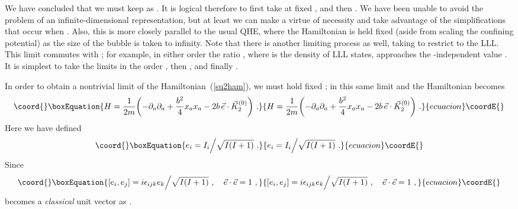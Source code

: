 \documentclass[a4paper,12pt]{article}
\begin{document}
We have concluded that we must keep \coordHE{} as \coordHE{}.  
It is logical therefore to first take \coordHE{} at fixed \coordHE{}, and then \coordHE{}.  We have been unable to avoid the problem of an infinite-dimensional
\coordHE{} representation, but at least we can make a virtue of necessity and take
advantage of the simplifications that occur when \coordHE{}.  Also, this
is more closely parallel to the usual QHE, where the Hamiltonian is held fixed
(aside from scaling the confining potential) as the size of the bubble is
taken to infinity.  Note that there is another limiting process as well,
taking \coordHE{} to restrict to the LLL.  This limit commutes with \coordHE{}; for example, in either order the ratio \coordHE{}, where \myHighlight{$\rho$}\coordHE{} is the
density of LLL states, approaches the
\coordHE{}-independent value \coordHE{}.  It is simplest
to take the limits in the order
\coordHE{}, then \coordHE{}, and finally \coordHE{}.

In order to obtain a nontrivial \coordHE{} limit of the
Hamiltonian~(\ref{su2ham}), we must hold fixed \coordHE{}; in this same limit
\coordHE{} and the Hamiltonian becomes
\begin{equation}\coord{}\boxEquation{
H = \frac{1}{2m} \biggl(-\partial_a \partial_a + \frac{b^2}{4} x_a x_a
- 2b\, \vec e \cdot \vec K_{2}^{(0)} \biggr)\ .
\label{limham}
}{
H = \frac{1}{2m} \biggl(-\partial_a \partial_a + \frac{b^2}{4} x_a x_a
- 2b\, \vec e \cdot \vec K_{2}^{(0)} \biggr)\ .
}{ecuacion}\coordE{}\end{equation}
Here we have defined
\begin{equation}\coord{}\boxEquation{
e_i = {I_i}\Big/{\sqrt{I(I+1)}}\ .
}{
e_i = {I_i}\Big/{\sqrt{I(I+1)}}\ .
}{ecuacion}\coordE{}\end{equation}
Since
\begin{equation}\coord{}\boxEquation{
[ e_i,  e_j] =  {i} \epsilon_{ijk}  e_k\Big/{\sqrt{I(I+1)}}\
,\quad \vec e
\cdot \vec e = 1\ ,
}{
[ e_i,  e_j] =  {i} \epsilon_{ijk}  e_k\Big/{\sqrt{I(I+1)}}\
,\quad \vec e
\cdot \vec e = 1\ ,
}{ecuacion}\coordE{}\end{equation}
\coordHE{} becomes a {\it classical} unit vector as \coordHE{}.  
\end{document}
